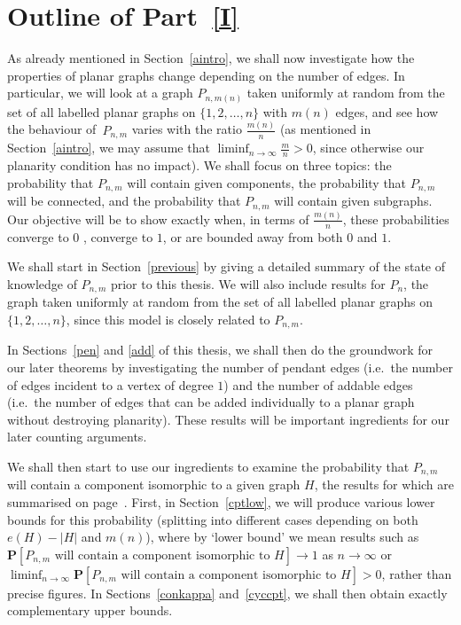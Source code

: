 \documentclass{article}
\newtheorem{Proof of Theorem}{Proof of Theorem}
\begin{document}
\section{Outline of Part~\ref{I}} \label{intro}















As already mentioned in Section~\ref{aintro},
we shall now investigate how the properties of planar graphs change depending on the number of edges.
In particular, we will look at a graph $P_{n,m(n)}$ 
taken uniformly at random from the set of all labelled planar graphs on $\{ 1,2, \ldots, n \}$
with $m(n)$ edges,
and see how the behaviour of~$P_{n,m}$
varies with the ratio $\frac{m(n)}{n}$
(as mentioned in Section~\ref{aintro},
we may assume that $\liminf_{n \to \infty} \frac{m}{n} > 0$,
since otherwise our planarity condition has no impact).
We shall focus on three topics:
the probability that $P_{n,m}$ will contain given components,
the probability that $P_{n,m}$ will be connected,
and the probability that $P_{n,m}$ will contain given subgraphs.
Our objective will be to show exactly when,
in terms of $\frac{m(n)}{n}$,
these probabilities converge to $0$ ,
converge to $1$,
or are bounded away from both $0$ and $1$.

We shall start in Section~\ref{previous}
by giving a detailed summary of the state of knowledge of $P_{n,m}$ prior to this thesis.
We will also include results for $P_{n}$,
the graph taken uniformly at random from the set of all labelled planar graphs on~$\{ 1,2, \ldots, n \}$,
since this model is closely related to $P_{n,m}$.

In Sections~\ref{pen} and \ref{add} of this thesis, 
we shall then do the groundwork for our later theorems by investigating the number of pendant edges
(i.e.~the number of edges incident to a vertex of degree $1$)
and the number of addable edges
(i.e.~the number of edges that can be added individually to a planar graph without destroying planarity).
These results will be important ingredients for our later counting arguments.

We shall then start to use our ingredients to examine
the probability that $P_{n,m}$ will contain a component isomorphic to a given graph $H$,
the results for which are summarised on page~\pageref{main cpt}.
First, in Section~\ref{cptlow},
we will produce various lower bounds for this probability
(splitting into different cases depending on both $e(H)-|H|$ and $m(n)$),
where by `lower bound' we mean results such as 
$\mathbf{P}[P_{n,m} \textrm{ will contain a component isomorphic to }H] \to 1$
as $n \to \infty$ 
or 
$\liminf_{n \to \infty} 
\mathbf{P}[P_{n,m} \textrm{ will contain a component isomorphic to }H] > 0$,
rather than precise figures.
In Sections~\ref{conkappa} and~\ref{cyccpt},
we shall then obtain exactly complementary upper bounds.
\end{document}
